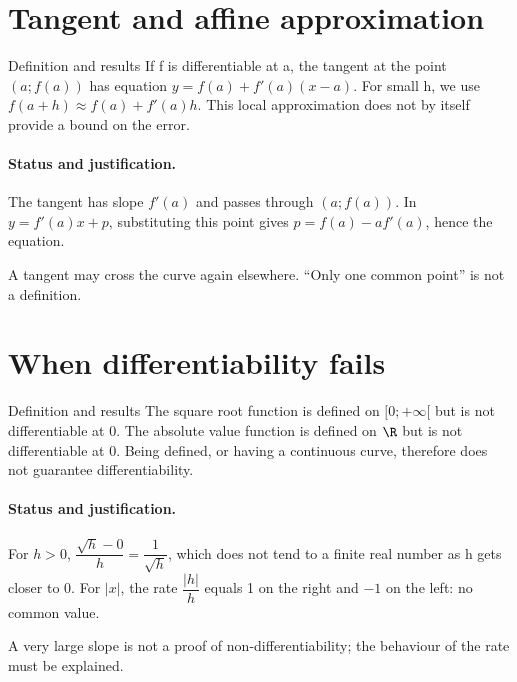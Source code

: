 \section{Tangent and affine approximation}\label{C04-U3}
\begin{repere}{Definition and results}
If f is differentiable at a, the tangent at the point $(a;f(a))$ has equation $y=f(a)+f\prime(a)(x-a)$. For small h, we use $f(a+h)\approx f(a)+f\prime(a)h$. This local approximation does not by itself provide a bound on the error.
\end{repere}
\paragraph{Status and justification.} The tangent has slope $f\prime(a)$ and passes through $(a;f(a))$. In $y=f\prime(a)x+p$, substituting this point gives $p=f(a)-af\prime(a)$, hence the equation.
\label{C04-EX3}

\begin{erreur}A tangent may cross the curve again elsewhere. ``Only one common point'' is not a definition.\end{erreur}
\label{C04-AP3}
\section{When differentiability fails}\label{C04-U4}
\begin{repere}{Definition and results}
The square root function is defined on $[0;+\infty[$ but is not differentiable at 0. The absolute value function is defined on $\R$ but is not differentiable at 0. Being defined, or having a continuous curve, therefore does not guarantee differentiability.
\end{repere}
\paragraph{Status and justification.} For $h>0$, $\dfrac{\sqrt h-0}{h}=\dfrac{1}{\sqrt h}$, which does not tend to a finite real number as h gets closer to 0. For $|x|$, the rate $\dfrac{|h|}{h}$ equals 1 on the right and $-1$ on the left: no common value.
\label{C04-EX4}
\begin{erreur}A very large slope is not a proof of non-differentiability; the behaviour of the rate must be explained.\end{erreur}
\label{C04-AP4}
